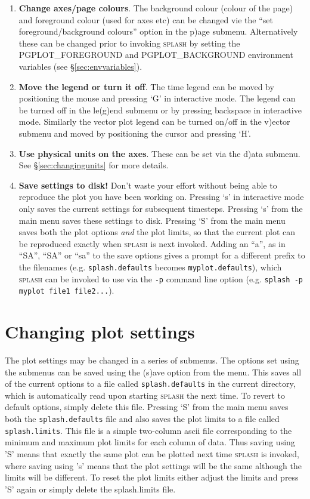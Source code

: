 \documentclass[a4paper,10pt]{article}
\newcommand{\splash}{\textsc{splash }}
\begin{document}
\begin{enumerate}
\item {\bf Change axes/page colours}. The background colour (colour of the page) and foreground colour (used for axes etc) can be changed vie the ``set foreground/background colours'' option in the p)age submenu. Alternatively these can be changed prior to invoking \splash by setting the PGPLOT\_FOREGROUND and PGPLOT\_BACKGROUND environment variables (see \S\ref{sec:envvariables}).
\item {\bf Move the legend or turn it off}. The time legend can be moved by positioning the mouse and pressing `G' in interactive mode. The legend can be turned off in the le(g)end submenu or by pressing backspace in interactive mode. Similarly the vector plot legend can be turned on/off in the v)ector submenu and moved by positioning the cursor and pressing `H'.
\item {\bf Use physical units on the axes}. These can be set via the d)ata submenu. See \S\ref{sec:changingunits} for more details.
\item {\bf Save settings to disk!} Don't waste your effort without being able to reproduce the plot you have been working on. Pressing `s' in interactive mode only saves the current settings for subsequent timesteps. Pressing `s' from the main menu saves these settings to disk. Pressing `S' from the main menu saves both the plot options \emph{and} the plot limits, so that the current plot can be reproduced exactly when \splash is next invoked. Adding an ``a'', as in ``SA'', ``SA'' or ``sa'' to the save options gives a prompt for a different prefix to the filenames (e.g. \verb+splash.defaults+ becomes \verb+myplot.defaults+), which \splash can be invoked to use via the \verb+-p+ command line option (e.g. \verb+splash -p myplot file1 file2...+).
\end{enumerate}

\section{Changing plot settings}
 The plot settings may be changed in a series of submenus. The options set using
the submenus can be saved using the (s)ave option from the menu. This saves all of
the current options to a file called \verb+splash.defaults+ in the current directory, which is
automatically read upon starting \splash the next time. To revert to default options, simply delete this file.
Pressing `S' from the main menu saves both the \verb+splash.defaults+ file and also saves the plot limits to a file called \verb+splash.limits+. This file is a simple two-column ascii file corresponding to the minimum and maximum plot limits for each column of data. Thus saving using 'S' means that exactly the same plot can be plotted next time \splash is invoked, where saving using 's' means that the plot settings will be the same although the limits will be different. To reset the plot limits either adjust the limits and press 'S' again or simply delete the splash.limits file.
\end{document}
